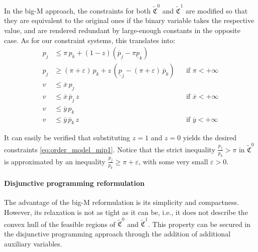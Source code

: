 \documentclass[11pt,parskip=full]{scrartcl}%
\newcommand*{\ie}{i.e., }
\begin{document}
In the big-M approach, the constraints for both $ \tilde{\mathfrak{C}}^0 $ and
$ \tilde{\mathfrak{C}}^1 $ are modified so that they are equivalent to the original ones if the
binary variable takes the respective value, and are rendered redundant by large-enough constants in
the opposite case.
As for our constraint systems, this translates into:
\begin{subequations}
\begin{align}
  p_j &\le \pi \, p_k + (1-z) (\overline{p}_j - \pi \underline{p}_k) \\
  p_j &\ge (\pi+\varepsilon) \, p_k
    + z \, (\underline{p}_j - (\pi+\varepsilon) \, \overline{p}_k)
    && \text{if } \pi < +\infty \\[1mm]
  v &\le \overline{x} \, p_j \\
  v &\le \overline{x} \, \overline{p}_j \, z
    && \text{if } \overline{x} < +\infty  \\[1mm]
  v &\le \overline{y} \, p_k \\
  v &\le \overline{y} \, \overline{p}_k \, z
    && \text{if } \overline{y} < +\infty
\end{align}
\label{eq:order_model_mip1_bigM}
\end{subequations}

It can easily be verified that substituting $ z=1 $ and $ z=0 $ yields the desired constraints
\eqref{eq:order_model_mip1}.
Notice that the strict inequality $ \frac{p_j}{p_k} > \pi $ in $ \tilde{\mathfrak{C}}^0 $ is
approximated by an inequality $ \frac{p_j}{p_k} \ge \pi + \varepsilon $, with some very small
$ \varepsilon > 0 $.

\paragraph{Disjunctive programming reformulation}

The advantage of the big-M reformulation is its simplicity and compactness.
However, its relaxation is not as tight as it can be, \ie it does not describe the convex hull of
the feasible regions of $ \tilde{\mathfrak{C}}^0 $ and $ \tilde{\mathfrak{C}}^1 $.
This property can be secured in the disjunctive programming approach through the addition of
additional auxiliary variables.
\end{document}
